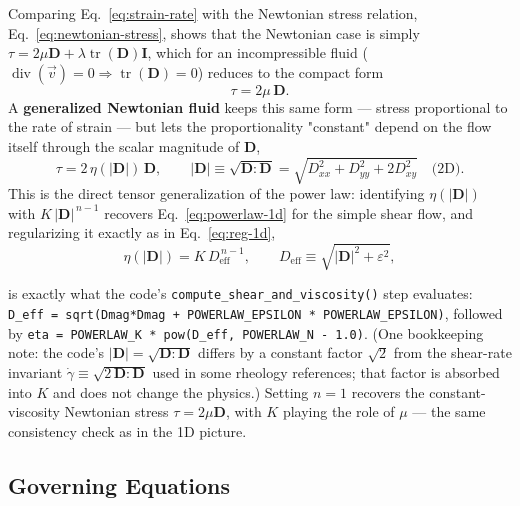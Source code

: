 \documentclass[11pt]{article}
\newcommand{\vv}{\vec{v}}
\begin{document}
Comparing Eq.~\eqref{eq:strain-rate} with the Newtonian stress relation, Eq.~\eqref{eq:newtonian-stress}, shows that the Newtonian case is simply $\tau=2\mu\mathbf{D}+\lambda\operatorname{tr}(\mathbf{D})\mathbf{I}$, which for an incompressible fluid ($\operatorname{div}(\vv)=0\Rightarrow\operatorname{tr}(\mathbf{D})=0$) reduces to the compact form
\begin{equation}
  \tau = 2\mu\,\mathbf{D}.
  \label{eq:tau-newtonian-compact}
\end{equation}
A \textbf{generalized Newtonian fluid} keeps this same form — stress proportional to the rate of strain — but lets the proportionality "constant" depend on the flow itself through the scalar magnitude of $\mathbf{D}$,
\begin{equation}
  \tau = 2\,\eta(|\mathbf{D}|)\,\mathbf{D}, \qquad |\mathbf{D}| \equiv \sqrt{\mathbf{D}:\mathbf{D}} = \sqrt{D_{xx}^2+D_{yy}^2+2D_{xy}^2}\quad\text{(2D)}.
  \label{eq:generalized-newtonian}
\end{equation}
This is the direct tensor generalization of the power law: identifying $\eta(|\mathbf{D}|)$ with $K\,|\mathbf{D}|^{\,n-1}$ recovers Eq.~\eqref{eq:powerlaw-1d} for the simple shear flow, and regularizing it exactly as in Eq.~\eqref{eq:reg-1d},
\begin{equation}
  \eta(|\mathbf{D}|) = K\,D_{\mathrm{eff}}^{\,n-1}, \qquad D_{\mathrm{eff}} \equiv \sqrt{|\mathbf{D}|^2 + \varepsilon^2},
  \label{eq:powerlaw-regularized}
\end{equation}
\begin{sloppypar}
is exactly what the code's \texttt{compute\_shear\_and\_viscosity()} step evaluates: \texttt{D\_eff = sqrt(Dmag*Dmag + POWERLAW\_EPSILON * POWERLAW\_EPSILON)}, followed by \texttt{eta = POWERLAW\_K * pow(D\_eff, POWERLAW\_N - 1.0)}. (One bookkeeping note: the code's $|\mathbf{D}|=\sqrt{\mathbf{D}:\mathbf{D}}$ differs by a constant factor $\sqrt2$ from the shear-rate invariant $\dot\gamma\equiv\sqrt{2\,\mathbf{D}:\mathbf{D}}$ used in some rheology references; that factor is absorbed into $K$ and does not change the physics.) Setting $n=1$ recovers the constant-viscosity Newtonian stress $\tau=2\mu\mathbf{D}$, with $K$ playing the role of $\mu$ — the same consistency check as in the 1D picture.
\end{sloppypar}

\subsection{Governing Equations}
\end{document}
